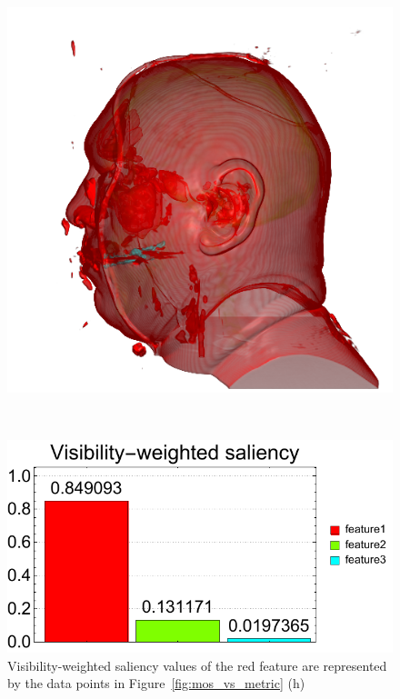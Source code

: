 \begin{figure}
\begin{minipage}{.24\textwidth}
		\includegraphics[width=1\linewidth]{images/vismale_naive_optimized_red_1000}
		\subcaption{}
	\end{minipage}~
	\begin{minipage}{.25\textwidth}
		\includegraphics[width=1\linewidth]{figures/vismale_naive_optimized_red_1000_visibility_saliency_weighted_chart}
		\subcaption{}
	\end{minipage}
	\caption{Visibility-weighted saliency values of the red feature are represented by the data points in Figure~\ref{fig:mos_vs_metric} (h)}
	\label{fig:vismale_feature1_charts}
\end{figure}

